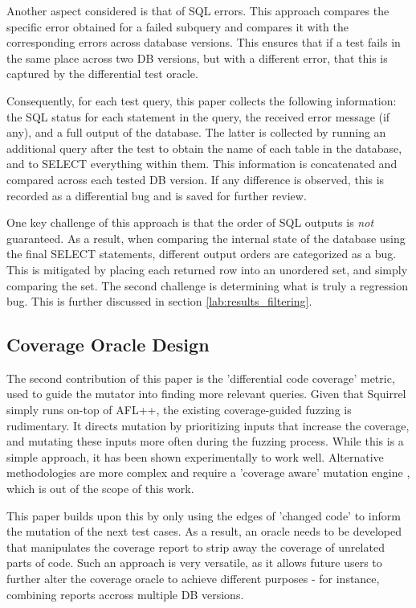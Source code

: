 \documentclass[sigconf]{acmart}
\begin{document}
Another aspect considered is that of SQL errors. This approach compares the specific error obtained for a failed subquery and compares it with the corresponding errors across database versions. This ensures that if a test fails in the same place across two DB versions, but with a different error, that this is captured by the differential test oracle.

Consequently, for each test query, this paper collects the following information: the SQL status for each statement in the query, the received error message (if any), and a full output of the database. The latter is collected by running an additional query after the test to obtain the name of each table in the database, and to SELECT everything within them. This information is concatenated and compared  across each tested DB version. If any difference is observed, this is recorded as a differential bug and is saved for further review.

One key challenge of this approach is that the order of SQL outputs is \textit{not} guaranteed. As a result, when comparing the internal state of the database using the final SELECT statements, different output orders are categorized as a bug. This is mitigated by placing each returned row into an unordered set, and simply comparing the set. The second challenge is determining what is truly a regression bug. This is further discussed in section \ref{lab:results_filtering}.

\subsection{Coverage Oracle Design}
The second contribution of this paper is the 'differential code coverage' metric, used to guide the mutator into finding more relevant queries. Given that Squirrel simply runs on-top of AFL++, the existing coverage-guided fuzzing is rudimentary. It directs mutation by prioritizing inputs that increase the coverage, and mutating these inputs more often during the fuzzing process. While this is a simple approach, it has been shown experimentally to work well. Alternative methodologies are more complex and require a 'coverage aware' mutation engine \cite{liang2022detecting}, which is out of the scope of this work.

This paper builds upon this by only using the edges of 'changed code' to inform the mutation of the next test cases. As a result, an oracle needs to be developed that manipulates the coverage report to strip away the coverage of unrelated parts of code. Such an approach is very versatile, as it allows future users to further alter the coverage oracle to achieve different purposes - for instance, combining reports accross multiple DB versions.
\end{document}
